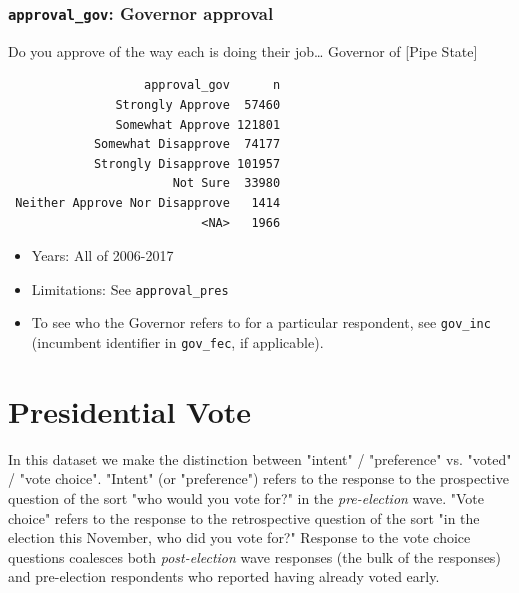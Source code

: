 \documentclass[10pt,article,oneside]{memoir}
\theoremstyle{definition}
\begin{document}
\hypertarget{approval_gov-governor-approval}{%
\subsubsection{\texorpdfstring{\texttt{approval\_gov}: Governor
approval}{approval\_gov: Governor approval}}\label{approval_gov-governor-approval}}

Do you approve of the way each is doing their job\ldots{} Governor of
{[}Pipe State{]}

\begin{verbatim}
                   approval_gov      n
               Strongly Approve  57460
               Somewhat Approve 121801
            Somewhat Disapprove  74177
            Strongly Disapprove 101957
                       Not Sure  33980
 Neither Approve Nor Disapprove   1414
                           <NA>   1966
\end{verbatim}

\begin{itemize}
\tightlist
\item
  Years: All of 2006-2017
\item
  Limitations: See \texttt{approval\_pres}
\item
  To see who the Governor refers to for a particular respondent, see
  \texttt{gov\_inc} (incumbent identifier in \texttt{gov\_fec}, if
  applicable).
\end{itemize}

\newpage

\hypertarget{presidential-vote}{%
\section{Presidential Vote}\label{presidential-vote}}

\begin{tcolorbox}[title={A note on \texttt{intent} and \texttt{voted}}]
In this dataset we make the distinction between "intent" / "preference" vs. "voted" / "vote choice". "Intent" (or "preference") refers to the response to the prospective question of the sort "who would you vote for?" in the \emph{pre-election} wave. "Vote choice" refers to the response to the retrospective question of the sort "in the election this November, who did you vote for?" Response to the vote choice questions coalesces both \emph{post-election} wave responses (the bulk of the responses) and pre-election respondents who reported having already voted early. 
\end{tcolorbox}
\end{document}
